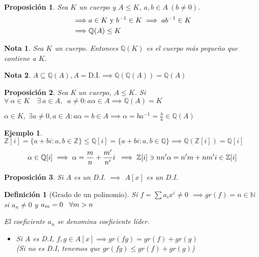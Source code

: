\documentclass[11pt, a4paper, titlepage]{article}
\makeatletter
\renewenvironment{proof}[1][\proofname] {\vspace{-15pt}\par\pushQED{\qed}\normalfont\topsep6\p@\@plus6\p@\relax\trivlist\item[\hskip\labelsep\it#1\@addpunct{.}]\ignorespaces}{\popQED\endtrivlist\@endpefalse}
\providecommand{\ent}{\mathbb{Z}}
\providecommand{\rac}{\mathbb{Q}}
\theoremstyle{theorem-style}
\newtheorem*{nprop}{Proposición}
\theoremstyle{definition-style}
\newtheorem*{ndef}{Definición}
\theoremstyle{remark-style}
\newtheorem*{nota}{Nota}
\theoremstyle{example-style}
\newtheorem*{ejemplo}{Ejemplo}
\makeatother
\begin{document}
\begin{nprop}
  Sea $K$ un cuerpo y $A\le K$, $a,b\in A\ (b\not=0)$.
  \begin{align}
    \implies& a\in K \text{ y } b^{-1}\in K \implies ab^{-1}\in K\notag\\
    \implies&\mathbb{Q}(A)\le K\notag
  \end{align}
\end{nprop}

\begin{nota}
 Sea $K$ un cuerpo. Entonces  $\mathbb{Q}(K)$ es el cuerpo más pequeño que contiene a $K$.
\end{nota}

\begin{nota}
  $A \subseteq \mathbb{Q}(A), A=\text{D.I.} \implies \rac(\rac(A)) = \rac(A)$
\end{nota}


\begin{nprop}
  Sea K un cuerpo, $A\le K$. Si $\forall\ \alpha\in K\quad \exists\ a\in A,\;\; a \not= 0 : a\alpha\in A \implies \rac(A)=K$
\end{nprop}

\begin{proof}
  $\alpha\in K,\; \exists a \ne 0, a\in A : a\alpha=b\in A \implies \alpha = ba^{-1} = \frac{b}{a}\in \rac(A)$
\end{proof}

\begin{ejemplo}
  $\ent[i] = \{a+bi : a,b\in \ent\} \le \rac[i] = \{a+bi : a,b\in \rac\} \implies \rac(\ent[i]) = \rac[i]$
  \[
    \alpha\in\rac[i]\implies\alpha=\frac{m}{n}+\frac{m'}{n'}i\; \implies \ent[i] \ni nn'\alpha = n'm+nm'i \in \ent[i]\notag
  \]
\end{ejemplo}

\begin{nprop}
	Si $A$ es un D.I. $\implies$ $A[x]$ es un D.I. 
\end{nprop}

\begin{ndef}[Grado de un polinomio]

Si $f=\sum a_i x^i \neq 0$ $\implies gr(f)=n\in \mathbb{N}$ si $a_n\neq 0$ y $a_m=0 \hspace{0.3cm} \forall m>n$ 

El coeficiente $a_n$ se denomina coeficiente líder.

\begin{itemize}
	\item Si A es D.I, $f,g \in A[x]\implies gr(fg) = gr(f)+gr(g)$\\
	(Si no es D.I, tenemos que $gr(fg) \le gr(f)+gr(g)$)
\end{itemize}
	
\end{ndef}
\end{document}
